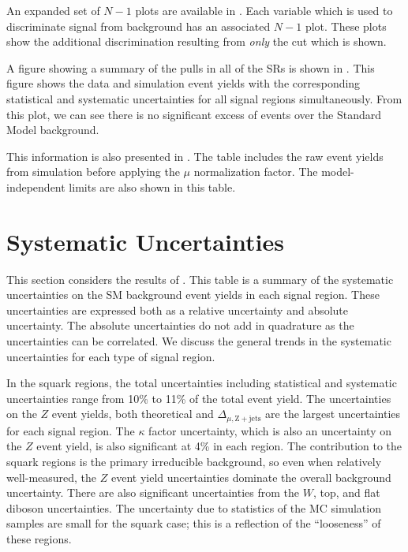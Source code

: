 An expanded set of $N-1$ plots are available in .
Each variable which is used to discriminate signal from background has an associated $N-1$ plot.
These plots show the additional discrimination resulting from \textit{only} the cut which is shown.

A figure showing a summary of the pulls in all of the SRs is shown in .
This figure shows the data and simulation event yields with the corresponding statistical and systematic uncertainties for all signal regions simultaneously.
From this plot, we can see there is no significant excess of events over the Standard Model background.

This information is also presented in .
The table includes the raw event yields from simulation before applying the $\mu$ normalization factor.
The model-independent limits are also shown in this table.

\section{Systematic Uncertainties}

This section considers the results of .
This table is a summary of the systematic uncertainties on the SM background event yields in each signal region.
These uncertainties are expressed both as a relative uncertainty and absolute uncertainty.
The absolute uncertainties do not add in quadrature as the uncertainties can be correlated.
We discuss the general trends in the systematic uncertainties for each type of signal region.

In the squark regions, the total uncertainties including statistical and systematic uncertainties range from 10\% to 11\% of the total event yield.
The uncertainties on the $Z$ event yields, both theoretical and $\Delta_{\mu,\mathrm{Z+jets}}$ are the largest uncertainties for each signal region.
The $\kappa$ factor uncertainty, which is also an uncertainty on the $Z$ event yield, is also significant at 4\% in each region.
The \Zvv contribution to the squark regions is the primary irreducible background, so even when relatively well-measured, the $Z$ event yield uncertainties dominate the overall background uncertainty.
There are also significant uncertainties from the $W$, top, and flat diboson uncertainties.
The uncertainty due to statistics of the MC simulation samples are small for the squark case; this is a reflection of the ``looseness'' of these regions.


